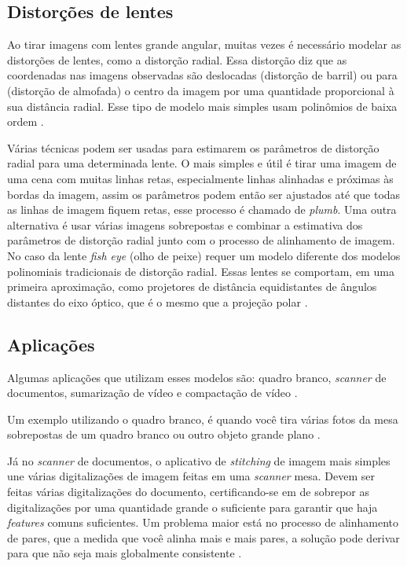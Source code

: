 \documentclass{article}
\begin{document}
\subsection{Distorções de lentes}
Ao tirar imagens com lentes grande angular, muitas vezes é necessário modelar as distorções de lentes, como a distorção radial. Essa distorção diz que as coordenadas nas imagens observadas são deslocadas (distorção de barril) ou para (distorção de almofada) o centro da imagem por uma quantidade proporcional à sua distância radial. Esse tipo de modelo mais simples usam polinômios de baixa ordem \cite{szeliski:2005}.

Várias técnicas podem ser usadas para estimarem os parâmetros de distorção radial para uma determinada lente. O mais simples e útil é tirar uma imagem de uma cena com muitas linhas retas, especialmente linhas alinhadas e próximas às bordas da imagem, assim os parâmetros podem então ser ajustados até que todas as linhas de imagem fiquem retas, esse processo é chamado de \textit{plumb}. Uma outra alternativa é usar várias imagens sobrepostas e combinar a estimativa dos parâmetros de distorção radial junto com o processo de alinhamento de imagem. No caso da lente \textit{fish eye} (olho de peixe) requer um modelo diferente dos modelos polinomiais tradicionais de distorção radial. Essas lentes se comportam, em uma primeira aproximação, como projetores de distância equidistantes de ângulos distantes do eixo óptico, que é o mesmo que a projeção polar \cite{szeliski:2005}.

\subsection{Aplicações}
Algumas aplicações que utilizam esses modelos são: quadro branco, \textit{scanner} de documentos, sumarização de vídeo e compactação de vídeo \cite{szeliski:2010}.

Um exemplo utilizando o quadro branco, é quando você tira várias fotos da mesa sobrepostas de um quadro branco ou outro objeto grande plano \cite{szeliski:2010}.

Já no \textit{scanner} de documentos, o aplicativo de \textit{stitching} de imagem mais simples une várias digitalizações de imagem feitas em uma \textit{scanner} mesa. Devem ser feitas várias digitalizações do documento, certificando-se em de sobrepor as digitalizações por uma quantidade grande o suficiente para garantir que haja \textit{features} comuns suficientes. Um problema maior está no processo de alinhamento de pares, que a medida que você alinha mais e mais pares, a solução pode derivar para que não seja mais globalmente consistente \cite{szeliski:2010}.
\end{document}
